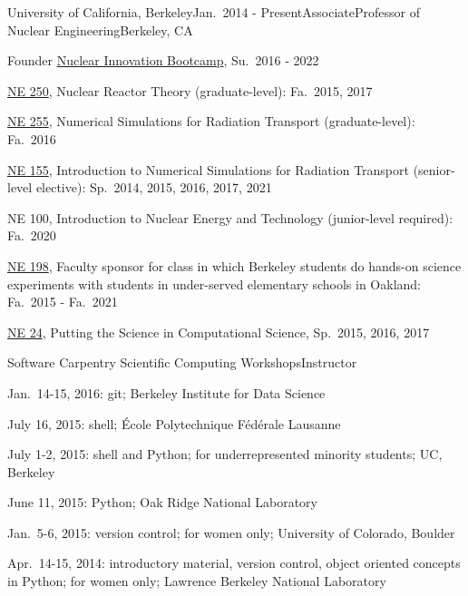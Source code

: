 \begin{rSubsection}{University of California, Berkeley}{Jan.\ 2014 - Present}{AssociateProfessor of Nuclear Engineering}{Berkeley, CA}
\item Founder \href{https://www.nuclearinnovationbootcamp.org/}{Nuclear
Innovation Bootcamp}, Su.\ 2016 - 2022 
\item \href{https://github.com/rachelslaybaugh/NE250}{NE 250}, Nuclear Reactor Theory (graduate-level): Fa.\ 2015, 2017
\item \href{https://github.com/rachelslaybaugh/NE255}{NE 255}, Numerical Simulations for Radiation Transport (graduate-level): Fa.\ 2016
\item \href{https://github.com/rachelslaybaugh/NE155}{NE 155}, Introduction to
Numerical Simulations for Radiation Transport (senior-level elective): Sp.\
2014, 2015, 2016, 2017, 2021
\item NE 100, Introduction to Nuclear Energy and Technology (junior-level required):
Fa.\ 2020 
\item \href{http://soesberkeley.weebly.com/}{NE 198}, Faculty sponsor for class
in which Berkeley students do hands-on science experiments with students in
under-served elementary schools in Oakland: Fa.\ 2015 - Fa.\ 2021
\item \href{https://github.com/rachelslaybaugh/NE24}{NE 24}, Putting the Science in Computational Science, Sp.\ 2015, 2016, 2017
\end{rSubsection}


\begin{rSubsection}{Software Carpentry Scientific Computing Workshops}{}{Instructor}{}
\item Jan.\ 14-15, 2016: git; Berkeley Institute for Data Science
\item July 16, 2015: shell; \'{E}cole Polytechnique F\'{e}d\'{e}rale Lausanne
\item July 1-2, 2015: shell and Python; for underrepresented minority students; UC, Berkeley
\item June 11, 2015: Python; Oak Ridge National Laboratory
\item Jan.\ 5-6, 2015: version control; for women only; University of Colorado, Boulder
\item Apr.\ 14-15, 2014: introductory material, version control, object oriented concepts in Python; for women only; Lawrence Berkeley National Laboratory
\end{rSubsection}


